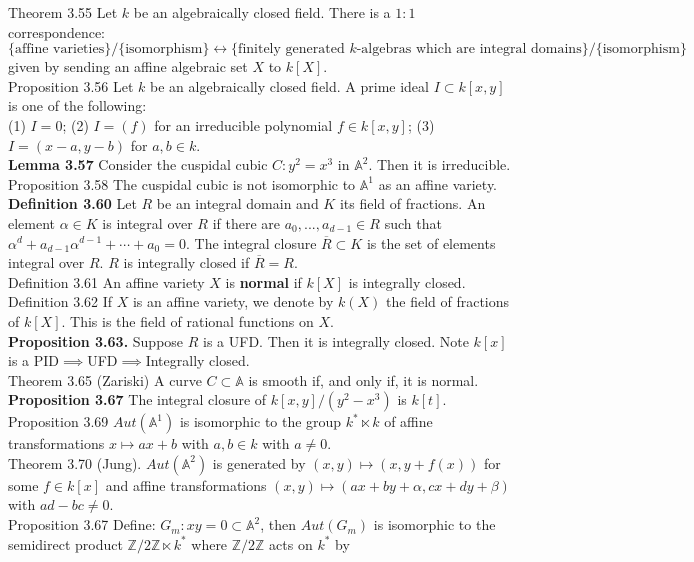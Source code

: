 \documentclass[8pt]{extarticle}
\begin{document}
Theorem 3.55 Let $k$ be an algebraically closed field. There is a $1:1$ correspondence: \\
$\{\text{affine varieties}\}/\{\text{isomorphism}\}\leftrightarrow \{\text{finitely generated $k$-algebras which are integral domains}\}/\{\text{isomorphism}\}$ given by sending an affine algebraic set $X$ to $k[X].$\\
Proposition 3.56 Let $k$ be an algebraically closed field. A prime ideal $I \subset k[x, y]$ is one of the following:\\
(1) $I = 0$; (2) $I = (f)$ for an irreducible polynomial $f\in k[x, y]$; (3) $I =(x-a,y-b)$ for $a,b\in k.$\\
\textbf{Lemma 3.57} Consider the cuspidal cubic $C : y^2 = x^3$ in $\mathbb{A}^2.$ Then it is irreducible.\\
Proposition 3.58 The cuspidal cubic is not isomorphic to $\mathbb{A}^1$ as an affine variety.\\
\textbf{Definition 3.60} Let $R$ be an integral domain and $K$ its field of fractions. An element $\alpha\in K$ is integral over $R$ if there are $a_0,...,a_{d-1}\in R$ such that $\alpha^d+a_{d-1}\alpha^{d-1}+\cdots+a_0=0.$  The integral closure $\overline{R} \subset K$ is the set of elements integral over $R.$ $R$ is integrally closed if $\overline{R}=R.$\\
Definition 3.61 An affine variety $X$ is \textbf{normal} if $k[X]$ is integrally closed.\\
Definition 3.62 If $X$ is an affine variety, we denote by $k(X)$ the field of fractions of $k[X].$ This is the field of rational functions on $X.$\\
\textbf{Proposition 3.63.} Suppose $R$ is a UFD. Then it is integrally closed. Note $k[x]$ is a PID$\implies$UFD$\implies$Integrally closed.\\
Theorem 3.65 (Zariski) A curve $C \subset \mathbb{A}$ is smooth if, and only if, it is normal.\\
\textbf{Proposition 3.67} The integral closure of $k[x, y]/(y^2 - x^3)$ is $k[t].$\\
Proposition 3.69 $Aut(\mathbb{A}^1)$ is isomorphic to the group $k^* \ltimes k$ of affine transformations $x\mapsto ax + b$ with $a,b\in k$ with $a\neq 0.$\\
Theorem 3.70 (Jung). $Aut(\mathbb{A}^2)$ is generated by $(x,y) \mapsto (x,y + f(x))$ for some $f \in k[x]$ and affine
transformations $(x,y)\mapsto(ax+by+\alpha,cx+dy+\beta)$ with $ad-bc\neq 0.$\\
Proposition 3.67 Define: $G_m: xy = 0 \subset \mathbb{A}^2$, then $Aut(G_m)$ is isomorphic to the semidirect product $\mathbb{Z}/2\mathbb{Z}\ltimes k^*$ where $\mathbb{Z}/2\mathbb{Z}$ acts on $k^*$ by
\end{document}
